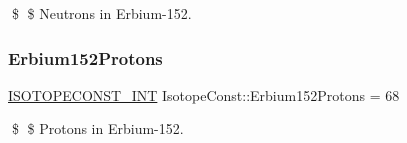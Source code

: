 \$ \$ Neutrons in Erbium-\/152. \mbox{\label{group___isotope_const-_erbium-_er152_ga1f4cb5110688dc77ce727af903a2ca11}} 
\subsubsection{\texorpdfstring{Erbium152\+Protons}{Erbium152Protons}}
{\footnotesize\ttfamily \mbox{\hyperlink{group___isotope_const-_macros_ga5f18360b3e99483a35c32d789e62621c}{I\+S\+O\+T\+O\+P\+E\+C\+O\+N\+S\+T\+\_\+\+I\+NT}} Isotope\+Const\+::\+Erbium152\+Protons = 68}

\$ \$ Protons in Erbium-\/152. 